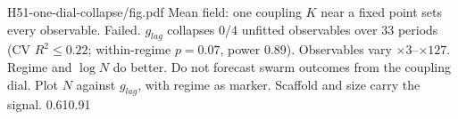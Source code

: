 {H51-one-dial-collapse/fig.pdf}
{Mean field: one coupling $K$ near a fixed point sets every observable.}
{Failed. $g_{lag}$ collapses 0/4 unfitted observables over 33 periods (CV $R^2\le0.22$; within-regime $p=0.07$, power 0.89). Observables vary $\times3$--$\times127$. Regime and $\log N$ do better.}
{Do not forecast swarm outcomes from the coupling dial. Plot $N$ against $g_{lag}$, with regime as marker. Scaffold and size carry the signal.}
{0.61}{0.91}
